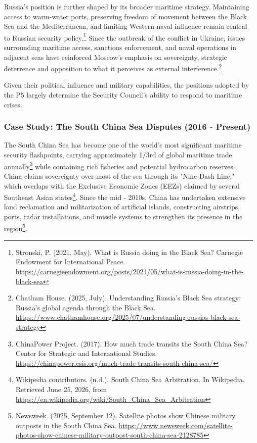 Russia’s position is further shaped by its broader maritime strategy. Maintaining access to warm-water ports, preserving freedom of movement between the Black Sea and the Mediterranean, and limiting Western naval influence remain central to Russian security policy.\footnote{Stronski, P. (2021, May). What is Russia doing in the Black Sea? Carnegie Endowment for International Peace. \url{https://carnegieendowment.org/posts/2021/05/what-is-russia-doing-in-the-black-sea}} Since the outbreak of the conflict in Ukraine, issues surrounding maritime access, sanctions enforcement, and naval operations in adjacent seas have reinforced Moscow’s emphasis on sovereignty, strategic deterrence and opposition to what it perceives as external interference.\footnote{Chatham House. (2025, July). Understanding Russia's Black Sea strategy: Russia's global agenda through the Black Sea. \url{https://www.chathamhouse.org/2025/07/understanding-russias-black-sea-strategy}}

Given their political influence and military capabilities, the positions adopted by the P5 largely determine the Security Council’s ability to respond to maritime crises.

\subsubsection{Case Study: The South China Sea Disputes (2016 - Present)}

The South China Sea has become one of the world's most significant maritime security flashpoints, carrying approximately 1/3rd of global maritime trade annually\footnote{ChinaPower Project. (2017). How much trade transits the South China Sea? Center for Strategic and International Studies. \url{https://chinapower.csis.org/much-trade-transits-south-china-sea/}} while containing rich fisheries and potential hydrocarbon reserves. China claims sovereignty over most of the sea through its "Nine-Dash Line," which overlaps with the Exclusive Economic Zones (EEZs) claimed by several Southeast Asian states\footnote{Wikipedia contributors. (n.d.). South China Sea Arbitration. In Wikipedia. Retrieved June 25, 2026, from \url{https://en.wikipedia.org/wiki/South_China_Sea_Arbitration}}. Since the mid - 2010s, China has undertaken extensive land reclamation and militarization of artificial islands, constructing airstrips, ports, radar installations, and missile systems to strengthen its presence in the region\footnote{Newsweek. (2025, September 12). Satellite photos show Chinese military outposts in the South China Sea. \url{https://www.newsweek.com/satellite-photos-show-chinese-military-outpost-south-china-sea-2128785}}.

